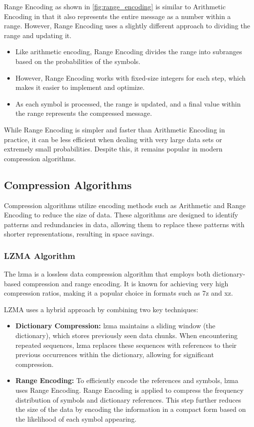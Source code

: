 \documentclass{ioereport}
\begin{document}
    Range Encoding as shown in \autoref{fig:range_encoding} is similar to Arithmetic Encoding in that it also represents the entire message as a number within a range. However, Range Encoding uses a slightly different approach to dividing the range and updating it.

    \begin{itemize}
        \item Like arithmetic encoding, Range Encoding divides the range into subranges based on the probabilities of the symbols.
        \item However, Range Encoding works with fixed-size integers for each step, which makes it easier to implement and optimize.
        \item As each symbol is processed, the range is updated, and a final value within the range represents the compressed message.
    \end{itemize}

    While Range Encoding is simpler and faster than Arithmetic Encoding in practice, it can be less efficient when dealing with very large data sets or extremely small probabilities. Despite this, it remains popular in modern compression algorithms.

    \subsection{Compression Algorithms}
    Compression algorithms utilize encoding methods such as Arithmetic and Range Encoding to reduce the size of data. These algorithms are designed to identify patterns and redundancies in data, allowing them to replace these patterns with shorter representations, resulting in space savings.

    \subsubsection{LZMA Algorithm}
    The \gls{lzma} is a lossless data compression algorithm that employs both dictionary-based compression and range encoding. It is known for achieving very high compression ratios, making it a popular choice in formats such as 7z and xz.

    LZMA uses a hybrid approach by combining two key techniques:
    \begin{itemize}
        \item \textbf{Dictionary Compression:} \gls{lzma} maintains a sliding window (the dictionary), which stores previously seen data chunks. When encountering repeated sequences, \gls{lzma} replaces these sequences with references to their previous occurrences within the dictionary, allowing for significant compression.
        \item \textbf{Range Encoding:} To efficiently encode the references and symbols, \gls{lzma} uses Range Encoding. Range Encoding is applied to compress the frequency distribution of symbols and dictionary references. This step further reduces the size of the data by encoding the information in a compact form based on the likelihood of each symbol appearing.
    \end{itemize}
\end{document}
